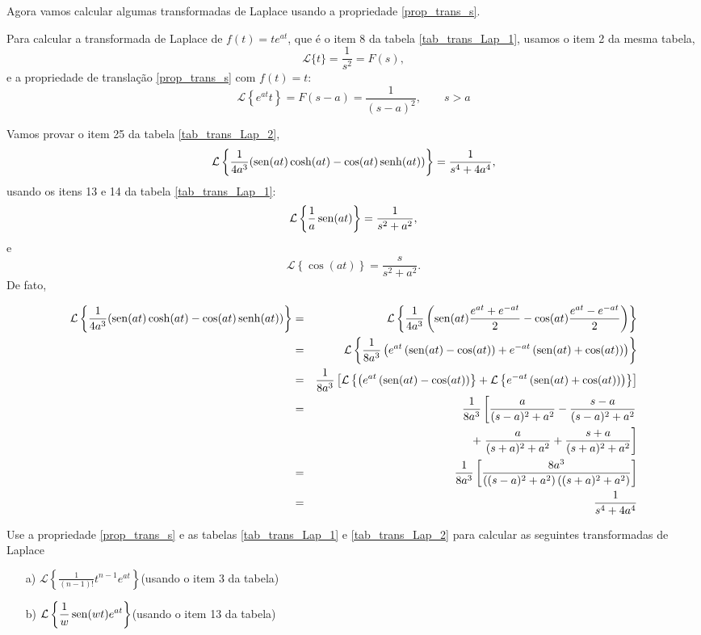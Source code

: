 Agora vamos calcular algumas transformadas de Laplace usando a propriedade \ref{prop_trans_s}.

\begin{ex}Para calcular a transformada de Laplace de $f(t)=te^{at}$, que é o item 8 da tabela \ref{tab_trans_Lap_1}, usamos o item 2 da mesma tabela,
$$
\mathcal{L}\{t\}=\frac{1}{s^2}=F(s),
$$
e a propriedade de translação \ref{prop_trans_s} com $f(t)=t$:
$$
\mathcal{L}\left\{e^{at}t\right\} =F(s-a)=\frac{1}{(s-a)^2},\qquad s>a
$$
\end{ex}
\begin{ex}Vamos provar o item 25 da tabela \ref{tab_trans_Lap_2},
$$
\mathcal{L}\left\{ \frac{1}{4a^3}(\operatorname{sen}(at)\cosh(at)-\cos(at)\operatorname{senh}(at))\right\}=\frac{1}{s^4+4a^4},
$$
usando os itens 13 e 14 da tabela \ref{tab_trans_Lap_1}:
$$
\mathcal{L}\left\{\frac{1}{a}\operatorname{sen}(at)\right\}=\frac{1}{s^2+a^2},
$$
e
$$
\mathcal{L}\left\{\cos(at)\right\}=\frac{s}{s^2+a^2}.
$$
De fato,
\begin{small}
\begin{eqnarray*}
\mathcal{L}\left\{ \frac{1}{4a^3}(\operatorname{sen}(at)\cosh(at)-\cos(at)\operatorname{senh}(at))\right\}&=&\mathcal{L}\left\{ \frac{1}{4a^3}\left(\operatorname{sen}(at)\frac{e^{at}+e^{-at}}{2}-\cos(at)\frac{e^{at}-e^{-at}}{2}\right)\right\}\\
&=&\mathcal{L}\left\{ \frac{1}{8a^3}\left(e^{at}\left( \operatorname{sen}(at)-\cos(at)\right)+e^{-at}\left(\operatorname{sen}(at)+\cos(at)\right)\right)\right\}\\
&=&\frac{1}{8a^3}\left[ \mathcal{L}\left\{ \left(e^{at}\left( \operatorname{sen}(at)-\cos(at)\right)\right\}+\mathcal{L}\left\{e^{-at}\left(\operatorname{sen}(at)+\cos(at)\right)\right)\right\}\right]\\
&=&\frac{1}{8a^3}\left[\frac{a}{(s-a)^2+a^2}-\frac{s-a}{(s-a)^2+a^2}\right.\\&&\hspace{40pt}+\left.\frac{a}{(s+a)^2+a^2}+\frac{s+a}{(s+a)^2+a^2}\right]\\
&=&\frac{1}{8a^3}\left[\frac{8a^3}{\left((s-a)^2+a^2\right)\left((s+a)^2+a^2\right)}\right]\\
&=&\frac{1}{s^4+4a^4}
\end{eqnarray*}
\end{small}
\end{ex}
\begin{prob}Use a propriedade \ref{prop_trans_s} e as tabelas \ref{tab_trans_Lap_1} e \ref{tab_trans_Lap_2} para calcular as seguintes transformadas de Laplace
\begin{itemize}
 \item[a)] $\displaystyle \mathcal{L}\left\{\frac{1}{(n-1)!}t^{n-1}e^{at}\right\}$\qquad (usando o item 3 da tabela)
 \item[b)] $\displaystyle \mathcal{L}\left\{\frac{1}{w}\operatorname{sen}(wt)e^{at}\right\}$\qquad (usando o item 13 da tabela)
\end{itemize}

\end{prob}
